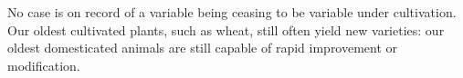 No case is on record of a variable being ceasing to be variable under cultivation. Our oldest cultivated plants, such as wheat, still often yield new varieties: our oldest domesticated animals are still capable of rapid improvement or modification.